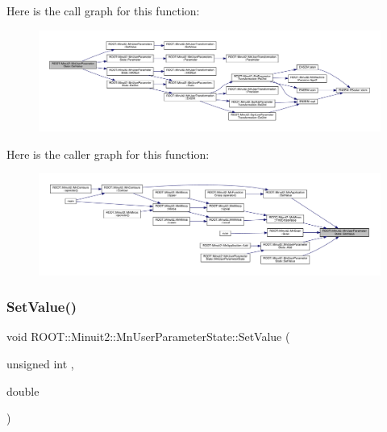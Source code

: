 Here is the call graph for this function\+:
\nopagebreak
\begin{figure}[H]
\begin{center}
\leavevmode
\includegraphics[width=350pt]{d3/de0/classROOT_1_1Minuit2_1_1MnUserParameterState_a90490f6f1ab718c8dae1c895d36baf65_cgraph}
\end{center}
\end{figure}
Here is the caller graph for this function\+:
\nopagebreak
\begin{figure}[H]
\begin{center}
\leavevmode
\includegraphics[width=350pt]{d3/de0/classROOT_1_1Minuit2_1_1MnUserParameterState_a90490f6f1ab718c8dae1c895d36baf65_icgraph}
\end{center}
\end{figure}
\mbox{\label{classROOT_1_1Minuit2_1_1MnUserParameterState_a90490f6f1ab718c8dae1c895d36baf65}} 
\subsubsection{\texorpdfstring{SetValue()}{SetValue()}\hspace{0.1cm}{\footnotesize\ttfamily [3/6]}}
{\footnotesize\ttfamily void R\+O\+O\+T\+::\+Minuit2\+::\+Mn\+User\+Parameter\+State\+::\+Set\+Value (\begin{DoxyParamCaption}\item[{unsigned int}]{,  }\item[{double}]{ }\end{DoxyParamCaption})}

